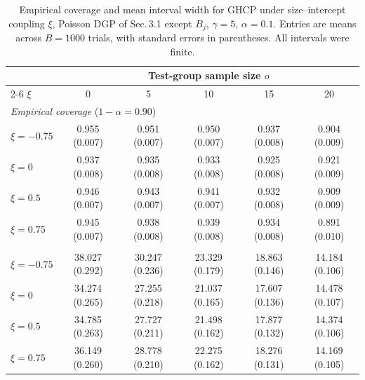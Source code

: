 \begin{table}
\centering
\caption{\footnotesize Empirical coverage and mean interval width for GHCP
under size--intercept coupling $\xi$, Poisson DGP of Sec.\,3.1 except $B_j$,
$\gamma=5$, $\alpha=0.1$. Entries are means across $B=1000$ trials,
with standard errors in parentheses. All intervals were finite.}
\label{tab:size-shift}
\small
\setlength{\tabcolsep}{6pt}
\begin{tabular}{lccccc}
\toprule
& \multicolumn{5}{c}{Test-group sample size $o$} \\
\cmidrule(lr){2-6}
$\xi$ & 0 & 5 & 10 & 15 & 20 \\
\midrule
\multicolumn{6}{l}{\textit{Empirical coverage} ($1-\alpha=0.90$)} \\[2pt]
$\xi=-0.75$
& 0.955 (0.007) & 0.951 (0.007) & 0.950 (0.007) & 0.937 (0.008) & 0.904 (0.009) \\
$\xi=0$
& 0.937 (0.008) & 0.935 (0.008) & 0.933 (0.008) & 0.925 (0.008) & 0.921 (0.009) \\
$\xi=0.5$
& 0.946 (0.007) & 0.943 (0.007) & 0.941 (0.007) & 0.932 (0.008) & 0.909 (0.009) \\
$\xi=0.75$
& 0.945 (0.007) & 0.938 (0.008) & 0.939 (0.008) & 0.934 (0.008) & 0.891 (0.010) \\
\addlinespace[4pt]
\multicolumn{6}{l}{\textit{Mean interval width}} \\[2pt]
$\xi=-0.75$
& 38.027 (0.292) & 30.247 (0.236) & 23.329 (0.179) & 18.863 (0.146) & 14.184 (0.106) \\
$\xi=0$
& 34.274 (0.265) & 27.255 (0.218) & 21.037 (0.165) & 17.607 (0.136) & 14.478 (0.107) \\
$\xi=0.5$
& 34.785 (0.263) & 27.727 (0.211) & 21.498 (0.162) & 17.877 (0.132) & 14.374 (0.106) \\
$\xi=0.75$
& 36.149 (0.260) & 28.778 (0.210) & 22.275 (0.162) & 18.276 (0.131) & 14.169 (0.105) \\
\bottomrule
\end{tabular}
\end{table}
